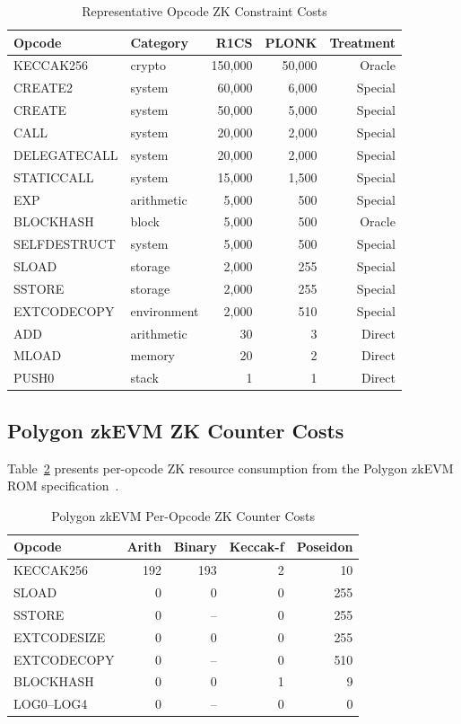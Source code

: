 \begin{table}[htbp]
\caption{Representative Opcode ZK Constraint Costs}
\label{tab:opcode-constraints}
\centering
\begin{tabular}{llrrr}
\toprule
\textbf{Opcode} & \textbf{Category} & \textbf{R1CS} & \textbf{PLONK} & \textbf{Treatment} \\
\midrule
KECCAK256 & crypto & 150{,}000 & 50{,}000 & Oracle \\
CREATE2 & system & 60{,}000 & 6{,}000 & Special \\
CREATE & system & 50{,}000 & 5{,}000 & Special \\
CALL & system & 20{,}000 & 2{,}000 & Special \\
DELEGATECALL & system & 20{,}000 & 2{,}000 & Special \\
STATICCALL & system & 15{,}000 & 1{,}500 & Special \\
EXP & arithmetic & 5{,}000 & 500 & Special \\
BLOCKHASH & block & 5{,}000 & 500 & Oracle \\
SELFDESTRUCT & system & 5{,}000 & 500 & Special \\
SLOAD & storage & 2{,}000 & 255 & Special \\
SSTORE & storage & 2{,}000 & 255 & Special \\
EXTCODECOPY & environment & 2{,}000 & 510 & Special \\
ADD & arithmetic & 30 & 3 & Direct \\
MLOAD & memory & 20 & 2 & Direct \\
PUSH0 & stack & 1 & 1 & Direct \\
\bottomrule
\end{tabular}
\end{table}

\subsection{Polygon zkEVM ZK Counter Costs}

Table~\ref{tab:polygon-counters} presents per-opcode ZK resource consumption
from the Polygon zkEVM ROM specification~\cite{polygon2024zkcounters}.

\begin{table}[htbp]
\caption{Polygon zkEVM Per-Opcode ZK Counter Costs}
\label{tab:polygon-counters}
\centering
\begin{tabular}{lrrrr}
\toprule
\textbf{Opcode} & \textbf{Arith} & \textbf{Binary} & \textbf{Keccak-f} & \textbf{Poseidon} \\
\midrule
KECCAK256 & 192 & 193 & 2 & 10 \\
SLOAD & 0 & 0 & 0 & 255 \\
SSTORE & 0 & -- & 0 & 255 \\
EXTCODESIZE & 0 & 0 & 0 & 255 \\
EXTCODECOPY & 0 & -- & 0 & 510 \\
BLOCKHASH & 0 & 0 & 1 & 9 \\
LOG0--LOG4 & 0 & -- & 0 & 0 \\
\bottomrule
\end{tabular}
\end{table}


